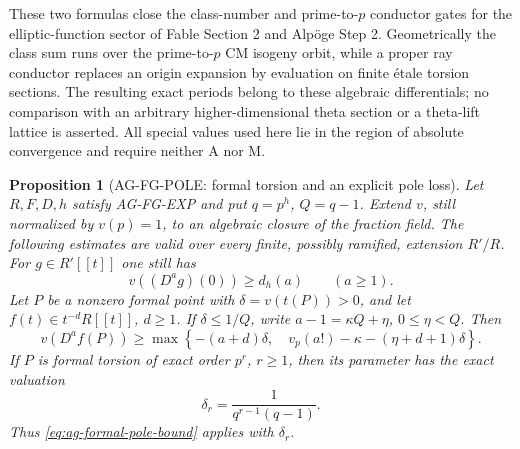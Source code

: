 \documentclass[11pt,a4paper]{article}
\newtheorem{proposition}{Proposition}
\begin{document}
These two formulas close the class-number and prime-to-$p$
conductor gates for the elliptic-function sector of Fable
Section 2 and Alp\"oge Step 2. Geometrically the class sum
runs over the prime-to-$p$ CM isogeny orbit, while a proper
ray conductor replaces an origin expansion by evaluation on
finite \'etale torsion sections. The resulting exact periods
belong to these algebraic differentials; no comparison with
an arbitrary higher-dimensional theta section or a theta-lift
lattice is asserted. All special values used here lie in the
region of absolute convergence and require neither A nor M.

\begin{proposition}[AG-FG-POLE: formal torsion and an explicit pole loss]
Let $R,F,D,h$ satisfy AG-FG-EXP and put $q=p^h$, $Q=q-1$.
Extend $v$, still normalized by $v(p)=1$, to an algebraic closure
of the fraction field. The following estimates are valid over
every finite, possibly ramified, extension $R'/R$.
For $g\in R'[[t]]$ one still has
\[
 v((D^ag)(0))\ge d_h(a)\qquad(a\ge1).
\]
Let $P$ be a nonzero formal point with $\delta=v(t(P))>0$,
and let $f(t)\in t^{-d}R[[t]]$, $d\ge1$. If
$\delta\le1/Q$, write $a-1=\kappa Q+\eta$,
$0\le\eta<Q$. Then
\begin{equation}\label{eq:ag-formal-pole-bound}
 v(D^af(P))\ge
 \max\left\{-(a+d)\delta,\quad
       v_p(a!)-\kappa-(\eta+d+1)\delta\right\}.
\end{equation}
If $P$ is formal torsion of exact order $p^r$, $r\ge1$,
then its parameter has the exact valuation
\[
 \delta_r=\frac1{q^{r-1}(q-1)}.
\]
Thus \eqref{eq:ag-formal-pole-bound} applies with $\delta_r$.
\end{proposition}
\end{document}
